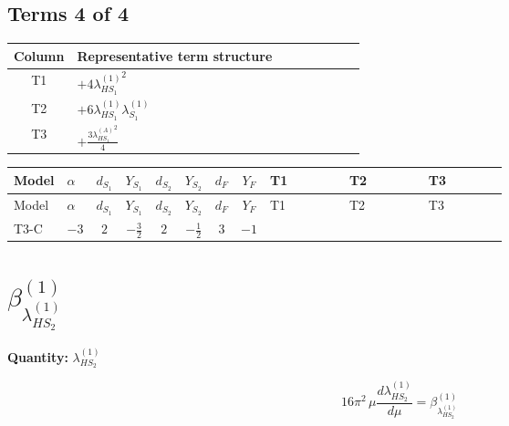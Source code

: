 \documentclass[8pt]{article}
\begin{document}
\begin{landscape}
\subsection*{Terms 4 of 4}
\begin{center}
\begin{tabular}{@{}c >{\raggedright\arraybackslash}p{0.82\linewidth}@{}}
\toprule
Column & Representative term structure \\
\midrule
T1 & \(\displaystyle +4 {\lambda_{HS_1}^{(1)}}^2\) \\
\midrule
T2 & \(\displaystyle +6 {\lambda_{HS_1}^{(1)}} {\lambda_{S_1}^{(1)}}\) \\
\midrule
T3 & \(\displaystyle +\frac{3 {\lambda_{HS_1}^{(A)}}^2}{4}\) \\
\midrule
\bottomrule
\end{tabular}
\end{center}
\smallskip
\tiny
\begin{longtable}{@{}llcccccc >{\raggedright\arraybackslash}p{0.21\linewidth} >{\raggedright\arraybackslash}p{0.21\linewidth} >{\raggedright\arraybackslash}p{0.21\linewidth}@{}}
\toprule
Model & $\alpha$ & $d_{S_1}$ & $Y_{S_1}$ & $d_{S_2}$ & $Y_{S_2}$ & $d_F$ & $Y_F$ & T1 & T2 & T3 \\
\midrule
\endfirsthead
\toprule
Model & $\alpha$ & $d_{S_1}$ & $Y_{S_1}$ & $d_{S_2}$ & $Y_{S_2}$ & $d_F$ & $Y_F$ & T1 & T2 & T3 \\
\midrule
\endhead
T3-C & $-3$ & $2$ & $-\frac{3}{2}$ & $2$ & $-\frac{1}{2}$ & $3$ & $-1$ & \scriptsize\adjustbox{max width=\linewidth}{$\begin{gathered} +4 {\lambda_{HS_1}^{(1)}}^2\end{gathered}$} & \scriptsize\adjustbox{max width=\linewidth}{$\begin{gathered} +6 {\lambda_{HS_1}^{(1)}} {\lambda_{S_1}^{(1)}}\end{gathered}$} & \scriptsize\adjustbox{max width=\linewidth}{$\begin{gathered} +\frac{3 {\lambda_{HS_1}^{(A)}}^2}{4}\end{gathered}$} \\
\midrule
\bottomrule
\end{longtable}
\clearpage
\section*{$\beta_{\lambda_{HS_2}^{(1)}}^{(1)}$}
\noindent\textbf{Quantity: }$\lambda_{HS_2}^{(1)}$\par\smallskip
\[16\pi^2\,\mu\frac{d \lambda_{HS_2}^{(1)}}{d\mu}=\beta_{\lambda_{HS_2}^{(1)}}^{(1)}\]

\end{landscape}
\end{document}
